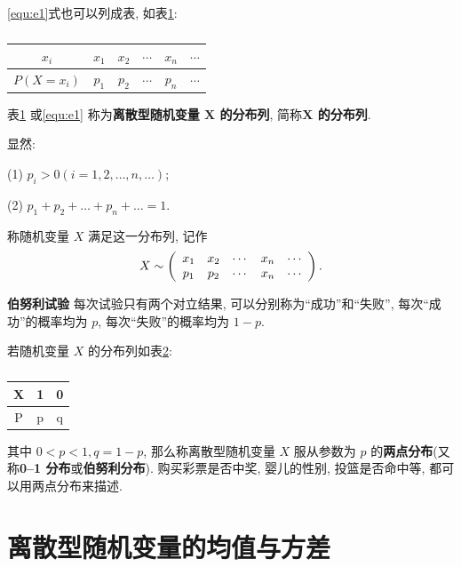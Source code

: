 \documentclass[titlepage]{ctexart}
\begin{document}
\eqref{equ:e1}式也可以列成表, 如表\ref{tab:t1}:

\begin{table}[htbp]
    \centering
    \caption{}\label{tab:t1}
        \begin{tabular}{c|c|c|c|c|c}
            \hline
            $x_{i}$ & $x_{1}$ & $x_{2}$ & $\cdots$ & $x_{n}$ & $\cdots$ \\
            \hline
            $P(X=x_{i})$ & $p_{1}$ & $p_{2}$ & $\cdots$ & $p_{n}$ & $\cdots$ \\
            \hline
        \end{tabular}
\end{table}

表\ref{tab:t1} 或\eqref{equ:e1} 称为\textbf{离散型随机变量 $\boldsymbol{X}$ 的分布列}, 简称\textbf{$\boldsymbol{X}$ 的分布列}.

显然:

(1) $p_{i} > 0(i=1,2,\dots,n,\dots)$;

(2) $p_{1} + p_{2} + \dots + p_{n} + \dots = 1$.

称随机变量 $X$ 满足这一分布列, 记作
\[
X \sim \left(
\begin{array}{c c c c c}
    x_{1} & x_{2} & \cdots & x_{n} & \cdots \\
    p_{1} & p_{2} & \cdots & x_{n} & \cdots
\end{array}
\right).
\]

\textbf{伯努利试验} \quad 每次试验只有两个对立结果, 可以分别称为``成功''和``失败'', 每次``成功''的概率均为 $p$, 每次``失败''的概率均为 $1-p$.

若随机变量 $X$ 的分布列如表\ref{tab:t2}:

\begin{table}[htbp]
    \centering
    \caption{}\label{tab:t2}
    \begin{tabular}{c|c|c}
        \hline
        X & 1 & 0 \\
        \hline
        P & p & q \\
        \hline
    \end{tabular}
\end{table}

其中 $0< p <1, q = 1 - p$, 那么称离散型随机变量 $X$ 服从参数为 $p$ 的\textbf{两点分布}(又称\textbf{0--1 分布}或\textbf{伯努利分布}).
购买彩票是否中奖, 婴儿的性别, 投篮是否命中等, 都可以用两点分布来描述.


\section{离散型随机变量的均值与方差}
\end{document}
